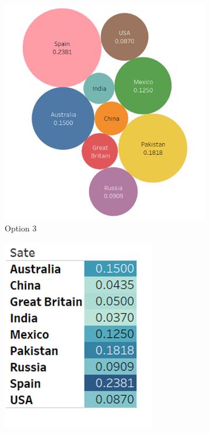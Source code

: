 \documentclass[11pt,fleqn]{book} %
\begin{document}
\begin{example}
\begin{figure}[hitb!]
\begin{subfigure}[c]{0.45\linewidth}
    \includegraphics[width=\linewidth]{Pictures/paq9-3.png}
    \caption{Option 3}
    \label{fig:pa1.9-op3}
  \end{subfigure}
  \hfill
  \begin{subfigure}[c]{0.45\linewidth}
    \includegraphics[width=\linewidth]{Pictures/paq9-4.png}

\end{subfigure}
\end{figure}
\end{example}
\end{document}
